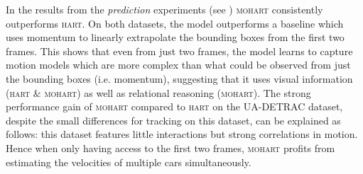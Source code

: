 In the results from the \textit{prediction} experiments (see ) \textsc{mohart} consistently outperforms \textsc{hart}. On both datasets, the model outperforms a baseline which uses momentum to linearly extrapolate the bounding boxes from the first two frames. This shows that even from just two frames, the model learns to capture motion models which are more complex than what could be observed from just the bounding boxes (i.e. momentum), suggesting that it uses visual information (\textsc{hart} \& \textsc{mohart}) as well as relational reasoning (\textsc{mohart}). The strong performance gain of \textsc{mohart} compared to \textsc{hart} on the UA-DETRAC dataset, despite the small differences for tracking on this dataset, can be explained as follows: this dataset features little interactions but strong correlations in motion. Hence when only having access to the first two frames, \textsc{mohart} profits from estimating the velocities of multiple cars simultaneously.